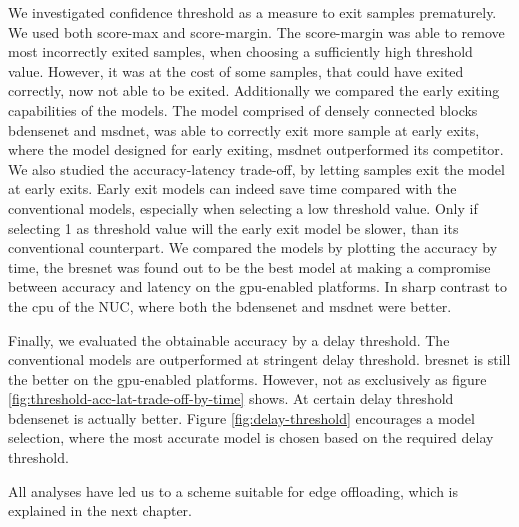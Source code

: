 We investigated confidence threshold as a measure to exit samples prematurely. We used both score-max and score-margin. The score-margin was able to remove most incorrectly exited samples, when choosing a sufficiently high threshold value. However, it was at the cost of some samples, that could have exited correctly, now not able to be exited. Additionally we compared the early exiting capabilities of the models. The model comprised of densely connected blocks \gls{bdensenet} and \gls{msdnet}, was able to correctly exit more sample at early exits, where the model designed for early exiting, \gls{msdnet} outperformed its competitor. We also studied the accuracy-latency trade-off, by letting samples exit the model at early exits. Early exit models can indeed save time compared with the conventional models, especially when selecting a low threshold value. Only if selecting 1 as threshold value will the early exit model be slower, than its conventional counterpart. We compared the models by plotting the accuracy by time, the \gls{bresnet} was found out to be the best model at making a compromise between accuracy and latency on the \gls{gpu}-enabled platforms. In sharp contrast to the \gls{cpu} of the NUC, where both the \gls{bdensenet} and \gls{msdnet} were better.

Finally, we evaluated the obtainable accuracy by a delay threshold. The conventional models are outperformed at stringent delay threshold. \gls{bresnet} is still the better on the \gls{gpu}-enabled platforms. However, not as exclusively as figure \ref{fig:threshold-acc-lat-trade-off-by-time} shows. At certain delay threshold \gls{bdensenet} is actually better. Figure \ref{fig:delay-threshold} encourages a model selection, where the most accurate model is chosen based on the required delay threshold. 

All analyses have led us to a scheme suitable for edge offloading, which is explained in the next chapter.
